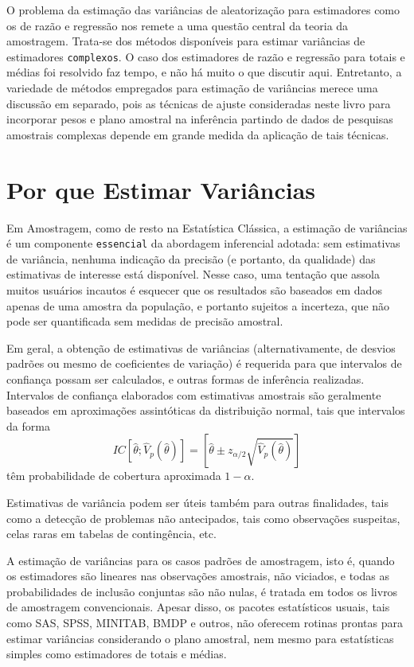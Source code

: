 \documentclass[]{book}
\theoremstyle{definition}
\theoremstyle{definition}
\theoremstyle{definition}
\theoremstyle{remark}
\begin{document}
O problema da estimação das variâncias de aleatorização para estimadores
como os de razão e regressão nos remete a uma questão central da teoria
da amostragem. Trata-se dos métodos disponíveis para estimar variâncias
de estimadores \texttt{complexos}. O caso dos estimadores de razão e
regressão para totais e médias foi resolvido faz tempo, e não há muito o
que discutir aqui. Entretanto, a variedade de métodos empregados para
estimação de variâncias merece uma discussão em separado, pois as
técnicas de ajuste consideradas neste livro para incorporar pesos e
plano amostral na inferência partindo de dados de pesquisas amostrais
complexas depende em grande medida da aplicação de tais técnicas.

\section{Por que Estimar Variâncias}\label{por-que-estimar-variancias}

Em Amostragem, como de resto na Estatística Clássica, a estimação de
variâncias é um componente \texttt{essencial} da abordagem inferencial
adotada: sem estimativas de variância, nenhuma indicação da precisão (e
portanto, da qualidade) das estimativas de interesse está disponível.
Nesse caso, uma tentação que assola muitos usuários incautos é esquecer
que os resultados são baseados em dados apenas de uma amostra da
população, e portanto sujeitos a incerteza, que não pode ser
quantificada sem medidas de precisão amostral.

Em geral, a obtenção de estimativas de variâncias (alternativamente, de
desvios padrões ou mesmo de coeficientes de variação) é requerida para
que intervalos de confiança possam ser calculados, e outras formas de
inferência realizadas. Intervalos de confiança elaborados com
estimativas amostrais são geralmente baseados em aproximações
assintóticas da distribuição normal, tais que intervalos da forma \[
IC\left[ \widehat{\theta };\widehat{V}_{p}\left( \widehat{\theta }\right)
\right] =\left[ \widehat{\theta }\pm z_{\alpha /2}\sqrt{\widehat{V}%
_{p}\left( \widehat{\theta }\right) }\right] 
\] têm probabilidade de cobertura aproximada \(1-\alpha\).

Estimativas de variância podem ser úteis também para outras finalidades,
tais como a detecção de problemas não antecipados, tais como observações
suspeitas, celas raras em tabelas de contingência, etc.

A estimação de variâncias para os casos padrões de amostragem, isto é,
quando os estimadores são lineares nas observações amostrais, não
viciados, e todas as probabilidades de inclusão conjuntas são não nulas,
é tratada em todos os livros de amostragem convencionais. Apesar disso,
os pacotes estatísticos usuais, tais como SAS, SPSS, MINITAB, BMDP e
outros, não oferecem rotinas prontas para estimar variâncias
considerando o plano amostral, nem mesmo para estatísticas simples como
estimadores de totais e médias.
\end{document}
